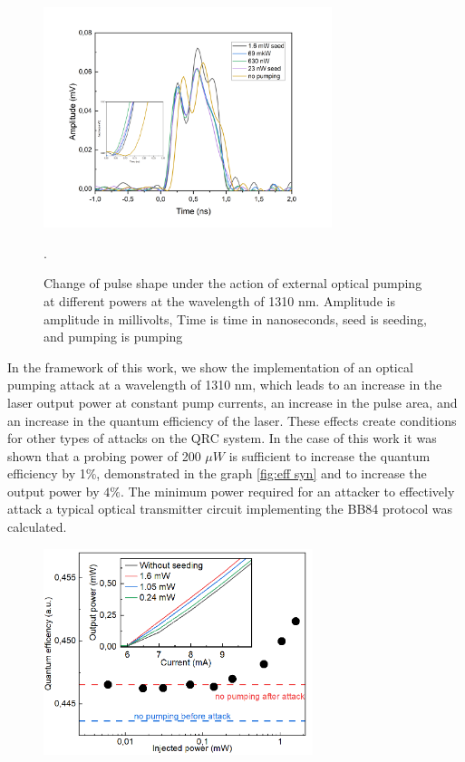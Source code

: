 {\begin{figure}
    \centering
    \includegraphics[width=0.75\textwidth]{images/Импульсы под действием 1310 для диссера.png}
    \caption{Change of pulse shape under the action of external optical pumping at different powers at the wavelength of 1310 nm. Amplitude is amplitude in millivolts, Time is time in nanoseconds, seed is seeding, and pumping is pumping}.
    \label{fig:pulses 1310 syn}
\end{figure}
\newpage In the framework of this work, we show the implementation of an optical pumping attack at a wavelength of 1310 nm, which leads to an increase in the laser output power at constant pump currents, an increase in the pulse area, and an increase in the quantum efficiency of the laser. These effects create conditions for other types of attacks on the QRC system. In the case of this work it was shown that a probing power of 200 $\mu W$ is sufficient to increase the quantum efficiency by 1\%, demonstrated in the graph \ref{fig:eff syn} and to increase the output power by $4\%$. The minimum power required for an attacker to effectively attack a typical optical transmitter circuit implementing the BB84 protocol was calculated.
\begin{figure}
    \centering
    \includegraphics[width=0.7\textwidth]{images/Эффективность 1310.png}

\end{figure}}

